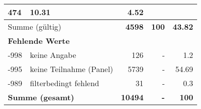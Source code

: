 \begin{longtable}{lXrrr}
       \num{474} &
       \num[round-mode=places,round-precision=2]{10,31} &
         \num[round-mode=places,round-precision=2]{4,52} \\
     \midrule
     \multicolumn{2}{l}{Summe (gültig)} &
       \textbf{\num{4598}} &
     \textbf{100} &
       \textbf{\num[round-mode=places,round-precision=2]{43,82}} \\
     \multicolumn{5}{l}{\textbf{Fehlende Werte}}\\
       -998 &
       keine Angabe &
         \num{126} &
        - &
         \num[round-mode=places,round-precision=2]{1,2} \\
       -995 &
       keine Teilnahme (Panel) &
         \num{5739} &
        - &
         \num[round-mode=places,round-precision=2]{54,69} \\
       -989 &
       filterbedingt fehlend &
         \num{31} &
        - &
         \num[round-mode=places,round-precision=2]{0,3} \\
     \midrule
     \multicolumn{2}{l}{\textbf{Summe (gesamt)}} &
          \textbf{\num{10494}} &
        \textbf{-} &
        \textbf{100} \\
     \bottomrule
     \end{longtable}
     
